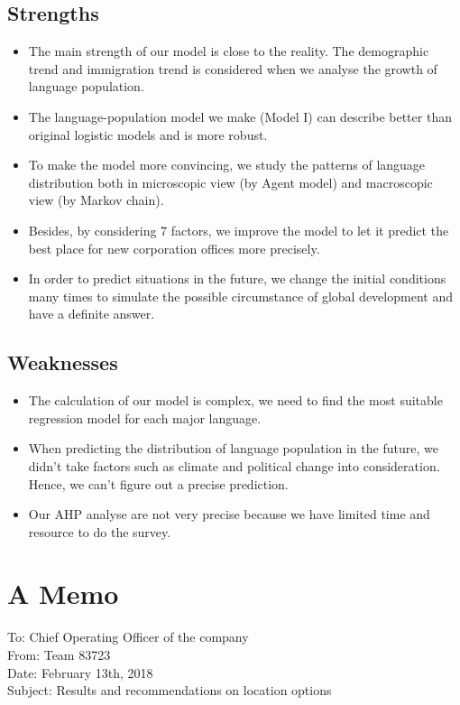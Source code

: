 \documentclass{mcmthesis}
\begin{document}
\subsection{Strengths}
\begin{itemize}
\item The main strength of our model is close to the reality. The demographic trend and immigration trend is considered when we analyse the growth of language population.
\item The language-population model we make (Model I) can describe better than original logistic models and is more robust.
\item To make the model more convincing, we study the patterns of language distribution both in microscopic view (by Agent model) and macroscopic view (by Markov chain).
\item Besides, by considering 7 factors, we improve the model to let it predict the best place for new corporation offices more precisely.
\item In order to predict situations in the future, we change the initial conditions many times to simulate the possible circumstance of global development and have a definite answer.
\end{itemize}

\subsection{Weaknesses}
\begin{itemize}
\item The calculation of our model is complex, we need to find the most suitable regression model for each major language.
\item When predicting the distribution of language population in the future, we didn't take factors such as climate and political change into consideration. Hence, we can't figure out a precise prediction.
\item Our AHP analyse are not very precise because we have limited time and resource to do the survey.
\end{itemize}

\section{A Memo}
To: Chief Operating Officer of the company \\
From: Team 83723 \\
Date: February 13th, 2018 \\
Subject: Results and recommendations on location options \\
\end{document}
